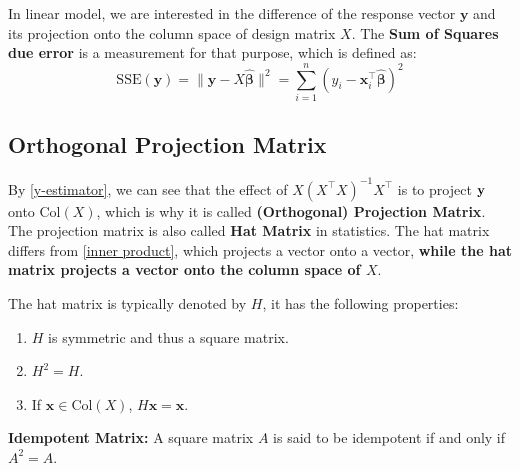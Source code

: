 \begin{Rem}
    In linear model, we are interested in the difference of the response vector $\mathbf{y}$ and its projection onto the column space of design matrix $X$. The \textbf{Sum of Squares due error} is a measurement for that purpose, which is defined as:
    \begin{equation} \label{SSE}
        \text{SSE}(\mathbf{y}) = \lVert \mathbf{y} - X\hat{\pmb{\beta}} \rVert^2 = \sum_{i = 1}^{n} (y_i - \mathbf{x}_i^{\top}\hat{\pmb{\beta}})^2
    \end{equation}
\end{Rem}

\subsection{Orthogonal Projection Matrix}
    By \cref{y-estimator}, we can see that the effect of 
    $X(X^{\top}X)^{-1}X^{\top}$ is to project $\mathbf{y}$ onto $\text{Col}(X)$, which is why it is called \textbf{(Orthogonal) Projection Matrix}. The projection matrix is also called \textbf{Hat Matrix} in statistics. The hat matrix differs from \cref{inner product}, which projects a vector onto a vector, \textbf{while the hat matrix projects a vector onto the column space of $X$}.

\begin{Rem}
    The hat matrix is typically denoted by $H$, it has the following properties:
    \begin{enumerate}
        \item $H$ is symmetric and thus a square matrix.
        \item $H^2 = H$.
        \item If $\mathbf{x}\in\text{Col}(X)$, $H\mathbf{x} = \mathbf{x}$.
    \end{enumerate}
\end{Rem}

\begin{Def}
    \textbf{Idempotent Matrix:} A square matrix $A$ is said to be idempotent if and only if $A^2 = A$.
\end{Def}

